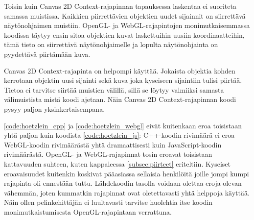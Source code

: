 



Toisin kuin Canvas 2D Context-rajapinnan tapauksessa laskentaa ei suoriteta samassa muistissa. Kaikkien piirrettävien objektien uudet sijainnit on siirrettävä näytönohjaimen muistiin. OpenGL- ja WebGL-rajapintojen monimutkaisemmassa koodissa täytyy ensin sitoa objektien kuvat laskettuihin uusiin koordinaatteihin, tämä tieto on siirrettävä näytönohjaimelle ja lopulta näytönohjainta on pyydettävä piirtämään kuva. 

Canvas 2D Context-rajapinta on helpompi käyttää. Jokaista objektia kohden kerrotaan objektin uusi sijainti sekä kuva joka kyseiseen sijaintiin tulisi piirtää. Tietoa ei tarvitse siirtää muistien välillä, sillä se löytyy valmiiksi samasta välimuistista mistä koodi ajetaan. Näin Canvas 2D Context-rajapinnan koodi pysyy paljon yksinkertaisempana.

\autoref{code:hoetzlein_cpp} ja \autoref{code:hoetzlein_webgl} eivät kuitenkaan eroa toisistaan yhtä paljon kuin koodista \ref{code:hoetzlein_js}: C++-koodin rivimäärä ei eroa WebGL-koodin rivimäärästä yhtä dramaattisesti kuin JavaScript-koodin rivimäärästä. OpenGL- ja WebGL-rajapinnat tosin eroavat toisistaan kattavuuden suhteen, kuten kappaleessa \ref{subsec:piirteet} eriteltiin. Kyseiset eroavaisuudet kuitenkin koskivat pääasiassa sellaisia henkilöitä joille jompi kumpi rajapinta oli ennestään tuttu. Lähdekoodin tasolla voidaan olettaa eroja olevan vähemmän, joten kummatkin rajapinnat ovat oletettavasti yhtä helppoja käyttää. Näin ollen pelinkehittäjän ei luultavasti tarvitse huolehtia itse koodin monimutkaistumisesta OpenGL-rajapintaan verrattuna. 


